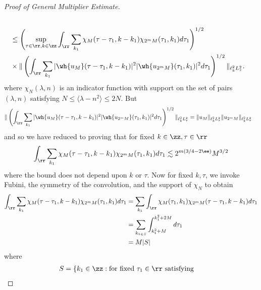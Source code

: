 \begin{proof}[Proof of General Multiplier Estimate]
\begin{equation*}
\begin{split}
\\
& \le \left ( \sup_{\tau \in \rr, k \in \zz} \int_{\rr} \sum_{k_{1}}
\chi_{M}(\tau - \tau_{1}, k - k_{1}) \chi_{2^{m}M}(\tau_{1}, k_{1}) d \tau_{1} \right )^{1/2}  
\\
& \times \| \left( \int_{\rr} \sum_{k_{1}} | \wh{u_{M}}(\tau - \tau_{1}, k - k_{1}) |^{2} | \wh{u_{2^{m}M}}(\tau_{1}, k_{1}) |^{2} d \tau_{1} \right)^{1/2} \|_{\ell^{2}_{k} L^{2}_{\tau}}. 
\end{split}
\end{equation*}
%
%
where $\chi_{N}(\lambda, n)$ is an indicator function with support on the set of pairs $(\lambda, n)$ satisfying $N \le \langle \lambda - n^{2} \rangle  \le 2N$.   But
%
%
\begin{equation*}
\begin{split}
  \| \left( \int_{\rr} \sum_{k_{1}} | \wh{u_{M}}(\tau - \tau_{1}, k - k_{1}) |^{2} | \wh{u_{2^{m}M}}(\tau_{1}, k_{1}) |^{2} d \tau_{1} \right)^{1/2} \|_{\ell^{2}_{k}L^{2}_{\tau}} 
  & = \| u_{M} \|_{\ell^{2}_{k}L^{2}_{\tau}} \| u_{2^{m} M} \|_{\ell^{2}_{k}L^{2}_{\tau}} 
\end{split}
\end{equation*}
%
%
and so we have reduced to proving that for fixed $k \in \zz, \tau \in \rr$
%
%
\begin{equation*}
\begin{split}
\int_{\rr} \sum_{k_{1}}
\chi_{M}(\tau - \tau_{1}, k - k_{1}) \chi_{2^{m}M}(\tau_{1}, k_{1}) d \tau_{1}  \lesssim 2^{m(3/4 - 2 \ee)} M^{3/2}
\end{split}
\end{equation*}
%
%
where the bound does not depend upon $k$ or $\tau$. Now for fixed $k, \tau$, we invoke Fubini, the symmetry of the convolution, and the support of $\chi_{N}$ to obtain
%
%
\begin{equation*}
\begin{split}
\int_{\rr} \sum_{k_{1}}
\chi_{M}(\tau - \tau_{1}, k - k_{1}) \chi_{2^{m}M}(\tau_{1}, k_{1}) d \tau_{1}  
& = 
\sum_{k_{1}}\int_{\rr} 
\chi_{M}(\tau_{1}, k_{1}) \chi_{2^{m}M}(\tau - \tau_{1}, k - k_{1}) d \tau_{1} 
\\
& = \sum_{k_{1 \in S}} \int_{k_{1}^{2} + M}^{k_{1}^{2} + 2M} d \tau_{1}
\\
& = M | S |
\end{split}
\end{equation*}
%
%
where
%
%
\begin{equation*}
\begin{split}
  S =  \{ & k_{1} \in \zz: \text{for fixed} \ \tau_{1} \in \rr \ \text{satisfying} \ 

\end{split}
\end{equation*}
\end{proof}
